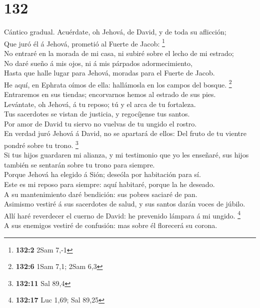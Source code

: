 \hypertarget{section-131}{%
\section{132}\label{section-131}}

 Cántico gradual. Acuérdate, oh Jehová, de David, y de toda
su aflicción;\\
 Que juró él á Jehová, prometió al Fuerte de Jacob:
\footnote{\textbf{132:2} 2Sam 7,-1}\\
 No entraré en la morada de mi casa, ni subiré sobre el
lecho de mi estrado;\\
 No daré sueño á mis ojos, ni á mis párpados
adormecimiento,\\
 Hasta que halle lugar para Jehová, moradas para el Fuerte
de Jacob.\\
 He aquí, en Ephrata oímos de ella: hallámosla en los campos
del bosque. \footnote{\textbf{132:6} 1Sam 7,1; 2Sam 6,3}\\
 Entraremos en sus tiendas; encorvarnos hemos al estrado de
sus pies.\\
 Levántate, oh Jehová, á tu reposo; tú y el arca de tu
fortaleza.\\
 Tus sacerdotes se vistan de justicia, y regocíjense tus
santos.\\
 Por amor de David tu siervo no vuelvas de tu ungido el
rostro.\\
 En verdad juró Jehová á David, no se apartará de ellos:
Del fruto de tu vientre pondré sobre tu trono. \footnote{\textbf{132:11}
  Sal 89,4}\\
 Si tus hijos guardaren mi alianza, y mi testimonio que yo
les enseñaré, sus hijos también se sentarán sobre tu trono para
siempre.\\
 Porque Jehová ha elegido á Sión; deseóla por habitación
para sí.\\
 Este es mi reposo para siempre: aquí habitaré, porque la
he deseado.\\
 A su mantenimiento daré bendición: sus pobres saciaré de
pan.\\
 Asimismo vestiré á sus sacerdotes de salud, y sus santos
darán voces de júbilo.\\
 Allí haré reverdecer el cuerno de David: he prevenido
lámpara á mi ungido. \footnote{\textbf{132:17} Luc 1,69; Sal 89,25}\\
 A sus enemigos vestiré de confusión: mas sobre él
florecerá su corona.

